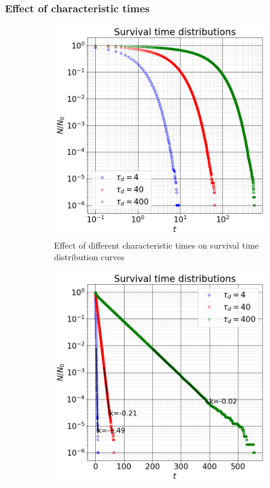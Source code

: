 \documentclass{article}
\begin{document}
\subsubsection{Effect of characteristic times}
\begin{figure}[htbp]
    \centering
    \begin{subfigure}[b]{0.48\textwidth}
        \centering
        \includegraphics[width=\textwidth]{images/survTimeDistCompareTau.png}
        \caption{Effect of different characteristic times on survival time distribution curves}
    \end{subfigure}
    \hfill
    \begin{subfigure}[b]{0.48\textwidth}
        \centering
        \includegraphics[width=\textwidth]{images/survTimeDistSemilogTau.png}

\end{subfigure}
\end{figure}
\end{document}
